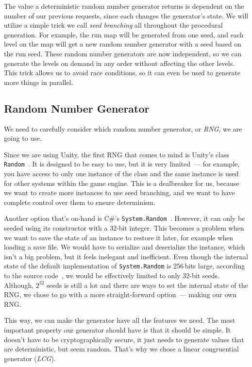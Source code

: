 The value a deterministic random number generator returns is dependent on the number of our previous requests, since each changes the generator's state.
We will utilize a simple trick we call \emph{seed branching} all throughout the procedural generation.
For example, the run map will be generated from one seed, and each level on the map will get a new random number generator with a seed based on the run seed.
These random number generators are now independent, so we can generate the levels on demand in any order without affecting the other levels.
This trick allows us to avoid race conditions, so it can even be used to generate more things in parallel.

\subsection{Random Number Generator}

We need to carefully consider which random number generator, or \emph{RNG}, we are going to use.

Since we are using Unity, the first RNG that comes to mind is Unity's class \texttt{Random}~\cite{UnityRandom}.
It is designed to be easy to use, but it is very limited~--- for example, you have access to only one instance of the class and the same instance is used for other systems within the game engine.
This is a dealbreaker for us, because we want to create more instances to use seed branching, and we want to have complete control over them to ensure determinism.

Another option that's on-hand is C\#'s \texttt{System.Random}~\cite{SystemRandom}.
However, it can only be seeded using its constructor with a 32-bit integer.
This becomes a problem when we want to save the state of an instance to restore it later, for example when loading a save file.
We would have to serialize and deserialize the instance, which isn't a big problem, but it feels inelegant and inefficient.
Even though the internal state of the default implementation of \texttt{System.Random} is 256\,bits large, according to the source code~\cite{SystemRandomSource}, we would be effectively limited to only 32-bit seeds.
Although, $2^{32}$ seeds is still a lot and there are ways to set the internal state of the RNG, we chose to go with a more straight-forward option~--- making our own RNG.

This way, we can make the generator have all the features we need.
The most important property our generator should have is that it should be simple.
It doesn't have to be cryptographically secure, it just needs to generate values that are deterministic, but seem random.
That's why we chose a linear congruential generator (\emph{LCG}).


